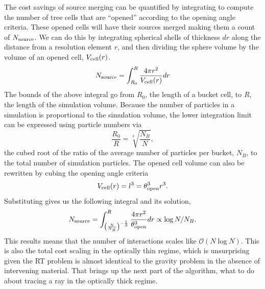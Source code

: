 \documentclass[fleq,usenatbib]{mnras}
\newcommand{\bigO}[1]{\mathcal{O}\left(#1\right)}
\newcommand{\NS}{N_{\rm source}}
\begin{document}
The cost savings of source merging can be quantified by integrating to compute 
the number of tree cells that are ``opened'' according to the opening angle 
criteria. These opened cells will have their sources merged making them a 
count of $\NS$. We can do this by integrating spherical shells 
of thickness $dr$ along the distance from a resolution element $r$, and then 
dividing the sphere volume by the volume of an opened cell, $V_{\rm cell}(r)$.
\begin{equation}
\label{eq:nsint}
\NS = \int_{R_0}^R \frac{4\pi r^2}{V_{\rm cell}(r)} dr
\end{equation}
The bounds of the above integral go from $R_0$, the length of a bucket 
cell, to $R$, the length of the simulation volume. Because the number of 
particles in a simulation is proportional to the simulation volume, the 
lower integration limit can be expressed using particle numbers via 
\begin{equation}
\label{eq:ratio}
\frac{R_0}{R} = \sqrt[3]{\frac{N_B}{N}},
\end{equation} 
the cubed root of the ratio of the average number of particles per bucket, 
$N_B$, to the total number of simulation particles. The opened cell volume can 
also be rewritten by cubing the opening angle criteria
\begin{equation}
\label{eq:vcell}
V_{\rm cell}(r) = l^3 = \theta_{\rm open}^3 r^3.
\end{equation}
Substituting gives us the following integral and its solution,
\begin{equation}
\label{eq:nssoln}
\NS = \int_{\left(\frac{N}{N_B}\right)^{-\frac{1}{3}}}^R 
\frac{4\pi r^2}{\theta_{\rm open}^3} dr
\propto \log{N/N_B}.
\end{equation}
This results means that the number of interactions scales like 
$\bigO{N \log N}$. This is also the total cost scaling in the optically 
thin regime, which is unsurprising given the RT problem is almost identical to 
the gravity problem in the absence of intervening material. That brings up the 
next part of the algorithm, what to do about tracing a ray in the optically 
thick regime.
\end{document}
